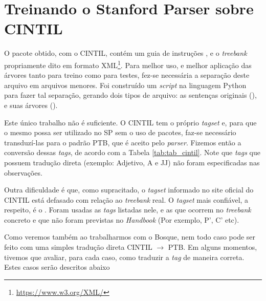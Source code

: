 \section{Treinando o Stanford Parser sobre CINTIL}
\label{treinando_sp_cintil}

O pacote obtido, com o CINTIL, contém um guia de instruções \cite{narrativeDescriptionCintil}, e o \textit{treebank} propriamente dito em formato XML\footnote{\url{https://www.w3.org/XML/}}. Para melhor uso, e melhor aplicação das árvores tanto para treino como para testes, fez-se necessária a separação deste arquivo em arquivos menores. Foi construído um \textit{script} na linguagem Python para fazer tal separação, gerando dois tipos de arquivo: as sentenças originais (), e suas árvores ().

Este único trabalho não é suficiente. 
O CINTIL tem o próprio \textit{tagset} e, para que o mesmo possa ser utilizado no SP sem o uso de pacotes, faz-se necessário transduzí-las para o padrão PTB, que é aceito pelo \textit{parser}.
Fizemos então a conversão dessas \textit{tags}, de acordo com a Tabela \ref{tab:tab_cintil}. Note que \textit{tags} que possuem tradução direta (exemplo: Adjetivo, A e JJ) não foram especificadas nas observações.

Outra dificuldade é que, como supracitado, o \textit{tagset} informado no site oficial do CINTIL está defasado com relação ao \textit{treebank} real. O \textit{tagset} mais confiável, a respeito, é o  \cite{cintil_handbook}. Foram usadas as \textit{tags} listadas nele, e as que ocorrem no \textit{treebank} concreto e que não foram previstas no \textit{Handbook} (Por exemplo, P’, C’ etc).

\begin{center}

\end{center}

Como veremos também ao trabalharmos com o Bosque, nem todo caso pode ser feito com uma simples tradução direta CINTIL $\rightarrow$ PTB. Em alguns momentos, tivemos que avaliar, para cada caso, como traduzir a \textit{tag} de maneira correta. Estes casos serão descritos abaixo
